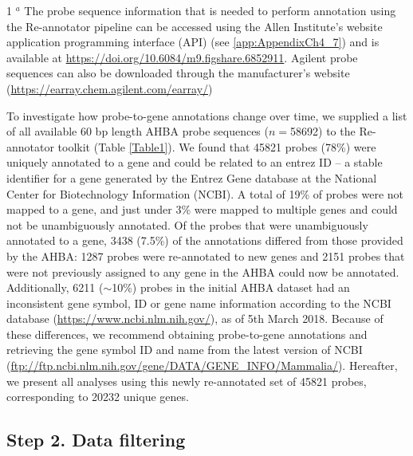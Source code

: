 \begin{table}[h!]
{\begin{tabular}{ll}
\end{tabular}}
\begin{tablenotes}
     \item[1] $^{a}$ The probe sequence information that is needed to perform annotation using the Re-annotator pipeline can be accessed using the Allen Institute’s website application programming interface (API) (see \ref{app:AppendixCh4_7}) and is available at \url{https://doi.org/10.6084/m9.figshare.6852911}. Agilent probe sequences can also be downloaded  through the manufacturer's website (\url{https://earray.chem.agilent.com/earray/})
   \end{tablenotes}
\end{table}

To investigate how probe-to-gene annotations change over time, we supplied a list of all available 60 bp length AHBA probe sequences ($n=$\num{58692}) to the Re-annotator toolkit \citep{Arloth2015} (Table \ref{Table1}). We found that \num{45821} probes (78\%) were uniquely annotated to a gene and could be related to an entrez ID -- a stable identifier for a gene generated by the Entrez Gene database at the National Center for Biotechnology Information (NCBI). A total of 19\% of probes were not mapped to a gene, and just under 3\% were mapped to multiple genes and could not be unambiguously annotated. Of the probes that were unambiguously annotated to a gene, \num{3438} (7.5\%) of the annotations differed from those provided by the AHBA: \num{1287} probes were re-annotated to new genes and \num{2151} probes that were not previously assigned to any gene in the AHBA could now be annotated. Additionally, \num{6211} ($\sim$10\%) probes in the initial AHBA dataset had an inconsistent gene symbol, ID or gene name information according to the NCBI database (\url{https://www.ncbi.nlm.nih.gov/}), as of 5th March 2018. Because of these differences, we recommend obtaining probe-to-gene annotations and retrieving the gene symbol ID and name from the latest version of NCBI (\url{ftp://ftp.ncbi.nlm.nih.gov/gene/DATA/GENE_INFO/Mammalia/}). Hereafter, we present all analyses using this newly re-annotated set of \num{45821} probes, corresponding to \num{20232} unique genes.

\subsection{Step 2. Data filtering}

